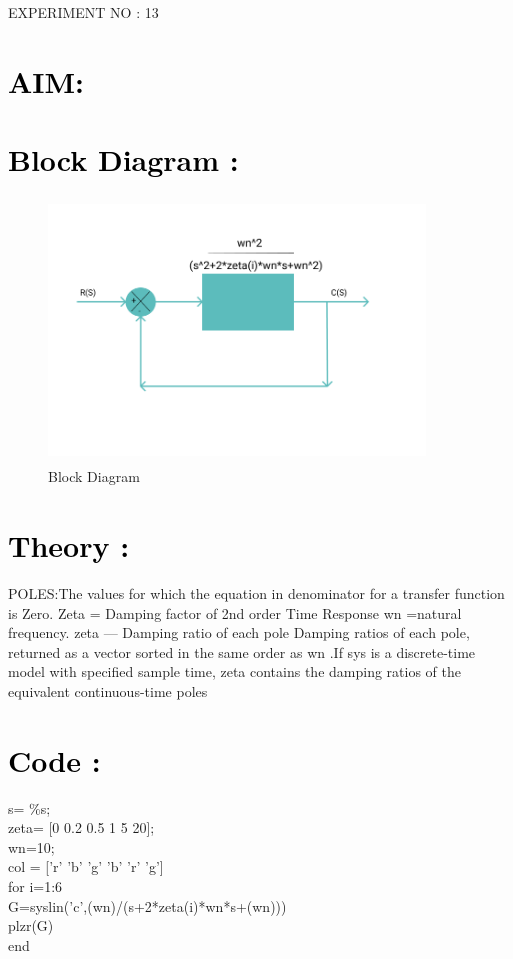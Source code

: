 \documentclass[12pt]{article}
\begin{document}
 \pagebreak


\begin{center}
    \LARGE {EXPERIMENT NO : 13}
             
\end{center}

\section*{\textcolor{black}{AIM: }}

\section*{\textcolor{black}{Block Diagram :}}

\begin{figure}[!hth]
        \centering
        \includegraphics[width =10cm, height = 7cm]{images/damping factor.png}
        \caption{Block Diagram}
        \label{Graph}
\end{figure}

\section*{\textcolor{black}{Theory :}}
POLES:The values for which the equation in denominator for a transfer function is Zero.
 Zeta = Damping factor of 2nd order Time Response 
  wn =natural frequency.
zeta — Damping ratio of each pole
Damping ratios of each pole, returned as a vector sorted in the same order as wn .If sys is a discrete-time model with specified sample time, zeta contains the damping ratios of the equivalent continuous-time poles
 \par

\section*{\textcolor{black}{Code :}}
s= \%s;\\
zeta= [0 0.2 0.5 1 5 20];\\
wn=10;\\
col = ['r' 'b' 'g' 'b' 'r' 'g']\\
for i=1:6\\
     G=syslin('c',(wn)/(s+2*zeta(i)*wn*s+(wn)))\\
     plzr(G)\\
end\\
\end{document}
